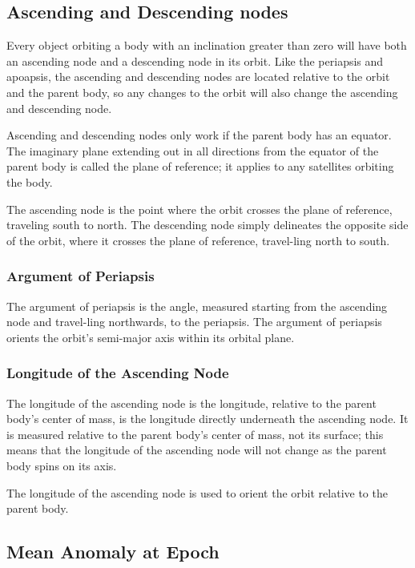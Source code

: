 \subsection{Ascending and Descending nodes}

Every object orbiting a body with an inclination greater than zero
will have both an ascending node and a descending node in its
orbit. Like the periapsis and apoapsis, the ascending and descending
nodes are located relative to the orbit and the parent body, so any
changes to the orbit will also change the ascending and descending
node.

Ascending and descending nodes only work if the parent body has an
equator. The imaginary plane extending out in all directions from the
equator of the parent body is called the plane of reference; it
applies to any satellites orbiting the body.

The ascending node is the point where the orbit crosses the plane of
reference, traveling south to north. The descending node simply
delineates the opposite side of the orbit, where it crosses the plane
of reference, travel-ling north to south.

\subsubsection{Argument of Periapsis}

The argument of periapsis is the angle, measured starting from the
ascending node and travel-ling northwards, to the periapsis. The
argument of periapsis orients the orbit's semi-major axis within its
orbital plane.

\subsubsection{Longitude of the Ascending Node}

The longitude of the ascending node is the longitude, relative to the
parent body's center of mass, is the longitude directly underneath the
ascending node. It is measured relative to the parent body's center of
mass, not its surface; this means that the longitude of the ascending
node will not change as the parent body spins on its axis.

The longitude of the ascending node is used to orient the orbit
relative to the parent body.

\subsection{Mean Anomaly at Epoch}

